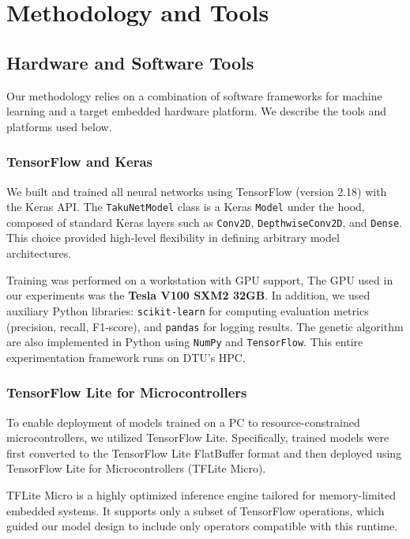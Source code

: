 \chapter{Methodology and Tools}





\section{Hardware and Software Tools}

Our methodology relies on a combination of software frameworks for machine learning and a target embedded hardware platform. We describe the tools and platforms used below.

\subsection*{TensorFlow and Keras}

We built and trained all neural networks using TensorFlow (version 2.18) with the Keras API. The \texttt{TakuNetModel} class is a Keras \texttt{Model} under the hood, composed of standard Keras layers such as \texttt{Conv2D}, \texttt{DepthwiseConv2D}, and \texttt{Dense}. This choice provided high-level flexibility in defining arbitrary model architectures.

Training was performed on a workstation with GPU support, The GPU used in our experiments was the \textbf{Tesla V100 SXM2 32GB}.
In addition, we used auxiliary Python libraries: \texttt{scikit-learn} for computing evaluation metrics (precision, recall, F1-score), and \texttt{pandas} for logging results. The genetic algorithm are also implemented in Python using \texttt{NumPy} and \texttt{TensorFlow}. This entire experimentation framework runs on DTU's HPC.

\subsection*{TensorFlow Lite for Microcontrollers}

To enable deployment of models trained on a PC to resource-constrained microcontrollers, we utilized TensorFlow Lite. Specifically, trained models were first converted to the TensorFlow Lite FlatBuffer format and then deployed using TensorFlow Lite for Microcontrollers (TFLite Micro).

TFLite Micro is a highly optimized inference engine tailored for memory-limited embedded systems. It supports only a subset of TensorFlow operations, which guided our model design to include only operators compatible with this runtime.

